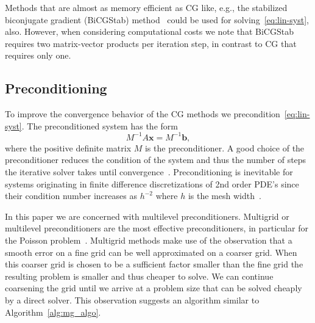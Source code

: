 Methods that are almost as memory efficient as CG like, e.g., the
stabilized biconjugate gradient (BiCGStab) method~\cite{vors:92} could
be used for solving~\eqref{eq:lin-syst}, also.  However, when
considering computational costs we note that BiCGStab requires two
matrix-vector products per iteration step, in contrast to CG that
requires only one.

\subsection{Preconditioning}

To improve the convergence behavior of the CG methods we
precondition~\eqref{eq:lin-syst}.  The preconditioned system has the
form
\begin{equation*}
  {M}^{-1}{A} \mathbf{x} = {M}^{-1}\mathbf{b},
\end{equation*}
where the positive definite matrix $M$ is the preconditioner.
A good choice of the preconditioner reduces the condition of the system
and thus the number of steps the iterative solver takes until
convergence~\cite{hack:94,gree:97}.  Preconditioning is inevitable for systems
originating in finite difference discretizations of 2nd order PDE's since
their condition number increases as $h^{-2}$ where $h$ is the mesh width~\cite{leve:07}.

In this paper we are concerned with multilevel preconditioners.
Multigrid or multilevel preconditioners are the most effective
preconditioners, in particular for the Poisson
problem~\cite{hack:85,tros:00}.  Multigrid methods make use of the
observation that a smooth error on a fine grid can be well approximated
on a coarser grid.  When this coarser grid is chosen to be a sufficient
factor smaller than the fine grid the resulting problem is smaller and
thus cheaper to solve.  We can continue coarsening the grid until we
arrive at a problem size that can be solved cheaply by a direct solver.
This observation suggests an algorithm similar to
Algorithm~\ref{alg:mg_algo}.

